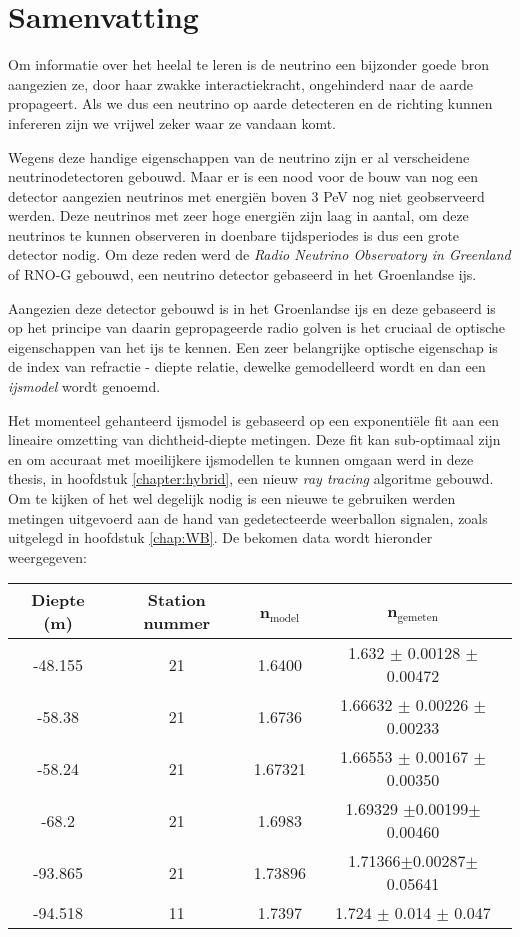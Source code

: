 \chapter*{Samenvatting}
Om informatie over het heelal te leren is de neutrino een bijzonder goede bron aangezien
ze, door haar zwakke interactiekracht, ongehinderd naar de aarde propageert.
Als we dus een neutrino op aarde detecteren en de richting kunnen infereren zijn we
vrijwel zeker waar ze vandaan komt.

Wegens deze handige eigenschappen van de neutrino zijn er al verscheidene neutrinodetectoren gebouwd.
Maar er is een nood voor de bouw van nog een detector aangezien neutrinos met energiën boven 3 PeV
nog niet geobserveerd werden. Deze neutrinos met zeer hoge energiën zijn laag in aantal,
om deze neutrinos te kunnen observeren in doenbare tijdsperiodes is dus een grote detector nodig.
Om deze reden werd de \textit{Radio Neutrino Observatory in Greenland} of RNO-G gebouwd, een 
neutrino detector gebaseerd in het Groenlandse ijs.

Aangezien deze detector gebouwd is in het Groenlandse ijs en deze gebaseerd is
op het principe van daarin gepropageerde radio golven is het cruciaal de
optische eigenschappen van het ijs te kennen. Een zeer belangrijke optische
eigenschap is de index van refractie - diepte relatie, dewelke gemodelleerd wordt
en dan een \textit{ijsmodel} wordt genoemd.

Het momenteel gehanteerd ijsmodel is gebaseerd op een exponentiële fit aan een lineaire omzetting van dichtheid-diepte metingen.
Deze fit kan sub-optimaal zijn en om accuraat met moeilijkere ijsmodellen
te kunnen omgaan werd in deze thesis, in hoofdstuk \ref{chapter:hybrid}, een nieuw \textit{ray tracing}
algoritme gebouwd. Om te kijken of het wel degelijk nodig is een nieuwe te gebruiken werden 
metingen uitgevoerd aan de hand van gedetecteerde weerballon signalen, zoals uitgelegd in hoofdstuk \ref{chap:WB}. 
De bekomen data wordt hieronder weergegeven:
\begin{center}
\begin{tabular}{||c c c c||}
 \hline
 Diepte (m) & Station nummer & n$_\text{model}$ & n$_\text{gemeten}$\\ [0.5ex]
 \hline\hline
 -48.155 & 21 & 1.6400 & 1.632 $\pm$ 0.00128 $\pm$ 0.00472\\
 -58.38 & 21 & 1.6736 & 1.66632 $\pm$ 0.00226 $\pm$ 0.00233 \\
 -58.24 & 21 & 1.67321 & 1.66553 $\pm$ 0.00167 $\pm$ 0.00350 \\
 -68.2 & 21 & 1.6983 & 1.69329 $\pm$0.00199$\pm$0.00460 \\
 -93.865 & 21 & 1.73896 & 1.71366$\pm$0.00287$\pm$0.05641\\
 -94.518 & 11 & 1.7397 & 1.724 $\pm$ 0.014 $\pm$ 0.047 \\
 \hline
\end{tabular}
\end{center}
